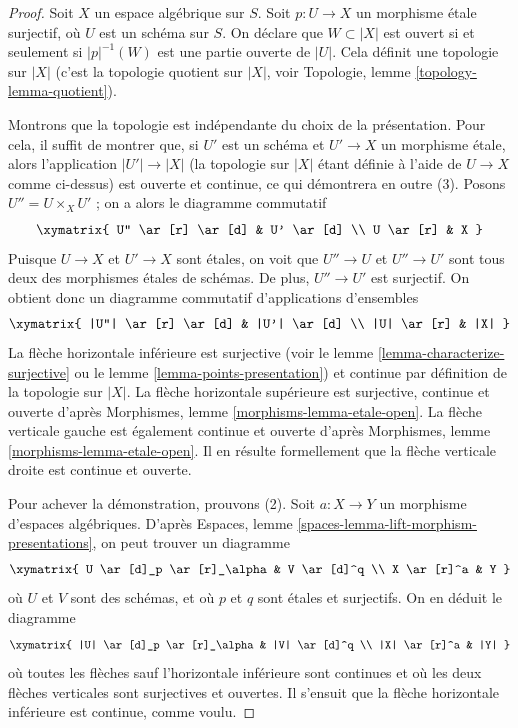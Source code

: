 \begin{proof}
Soit $X$ un espace algébrique sur $S$. Soit $p : U \to X$ un
morphisme étale surjectif, où $U$ est un schéma sur $S$.
On déclare que $W \subset |X|$ est ouvert si et seulement si $|p|^{-1}(W)$
est une partie ouverte de $|U|$. Cela définit une topologie sur $|X|$
(c'est la topologie quotient sur $|X|$, voir
Topologie, lemme \ref{topology-lemma-quotient}).

\medskip\noindent
Montrons que la topologie est indépendante du choix de
la présentation. Pour cela, il suffit de montrer que, si $U'$ est un schéma
et $U' \to X$ un morphisme étale, alors l'application $|U'| \to |X|$
(la topologie sur $|X|$ étant définie à l'aide de $U \to X$ comme ci-dessus)
est ouverte et continue, ce qui démontrera en outre (3).
Posons $U'' = U \times_X U'$ ; on a alors le diagramme commutatif
$$
\xymatrix{
U'' \ar[r] \ar[d] & U' \ar[d] \\
U \ar[r] & X
}
$$
Puisque $U \to X$ et $U' \to X$ sont étales, on voit que
$U'' \to U$ et $U'' \to U'$ sont tous deux des morphismes étales de schémas.
De plus, $U'' \to U'$ est surjectif. On obtient donc
un diagramme commutatif d'applications d'ensembles
$$
\xymatrix{
|U''| \ar[r] \ar[d] & |U'| \ar[d] \\
|U| \ar[r] & |X|
}
$$
La flèche horizontale inférieure est surjective (voir le
lemme \ref{lemma-characterize-surjective}
ou le
lemme \ref{lemma-points-presentation})
et continue par définition de la topologie sur $|X|$.
La flèche horizontale supérieure est surjective, continue et ouverte d'après
Morphismes, lemme \ref{morphisms-lemma-etale-open}.
La flèche verticale gauche est également continue et ouverte d'après
Morphismes, lemme \ref{morphisms-lemma-etale-open}.
Il en résulte formellement que la flèche verticale droite
est continue et ouverte.

\medskip\noindent
Pour achever la démonstration, prouvons (2).
Soit $a : X \to Y$ un morphisme d'espaces algébriques. D'après
Espaces, lemme \ref{spaces-lemma-lift-morphism-presentations},
on peut trouver un diagramme
$$
\xymatrix{
U \ar[d]_p \ar[r]_\alpha & V \ar[d]^q \\
X \ar[r]^a & Y
}
$$
où $U$ et $V$ sont des schémas, et où $p$ et $q$ sont étales et surjectifs.
On en déduit le diagramme
$$
\xymatrix{
|U| \ar[d]_p \ar[r]_\alpha & |V| \ar[d]^q \\
|X| \ar[r]^a & |Y|
}
$$
où toutes les flèches sauf l'horizontale inférieure sont continues et
où les deux flèches verticales sont surjectives et ouvertes. Il s'ensuit que la
flèche horizontale inférieure est continue, comme voulu.
\end{proof}

